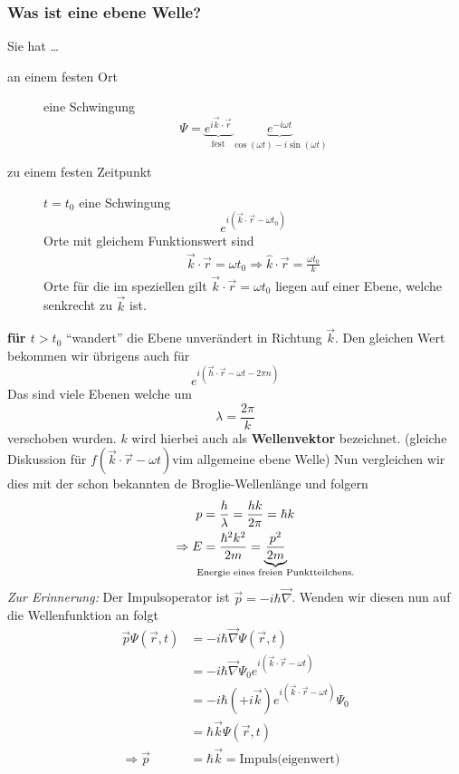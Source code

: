 \documentclass[oneside]{book}
\theoremstyle{definition}
\begin{document}
\subsubsection{Was ist eine ebene Welle?}
Sie hat \dots
\begin{description}
	\item[an einem festen Ort] eine Schwingung 
	$$\Psi = \underbrace{e^{i\vec{k} \cdot \vec{r}}}_{\text{fest}} \underbrace{e^{-i\omega t}}_{\cos(\omega t) - i \sin(\omega t)}$$
	\item[zu einem festen Zeitpunkt] $t = t_0$ eine Schwingung 
	$$e^{i (\vec{k} \cdot \vec{r} - \omega t_0)}$$
	Orte mit gleichem Funktionswert sind
	\begin{align*}
	\vec{k} \cdot \vec{r} = \omega t_0 \Rightarrow \hat{k} \cdot \vec{r} = \frac{\omega t_0}{k}
	\end{align*}
	Orte für die im speziellen gilt $\vec{k} \cdot \vec{r} = \omega t_0$ liegen auf einer Ebene, welche senkrecht zu $\vec{k}$ ist.
\end{description}
\textbf{für $t > t_0$} "`wandert"' die Ebene unverändert in Richtung $\vec{k}$.
Den gleichen Wert bekommen wir übrigens auch für 
$$e^{i(\vec{h} \cdot \vec{r} - \omega t - 2 \pi n)}$$
Das sind viele Ebenen welche um
$$\lambda = \frac{2\pi}{k}$$
verschoben wurden. $k$ wird hierbei auch als \textbf{Wellenvektor} bezeichnet.
(gleiche Diskussion für $f(\vec{k} \cdot \vec{r} - \omega t)$vim allgemeine ebene Welle)
Nun vergleichen wir dies mit der schon bekannten de Broglie-Wellenlänge und folgern
\begin{align*}
p &= \frac{h}{\lambda} = \frac{hk}{2\pi} = \hbar k\\
\Rightarrow E &= \frac{\hbar^2 k^2}{2m} = \underbrace{\frac{p^2}{2m}}_{\hspace{-10em}\text{Energie eines freien Punktteilchens.}\hspace{-10em}}
\end{align*}
\textit{Zur Erinnerung:} Der Impulsoperator ist $\vec{p} = - i \hbar \vec{\nabla}$. Wenden wir diesen nun auf die Wellenfunktion an folgt
\begin{align*}
	\vec{p} \Psi(\vec{r}, t) &= - i \hbar \vec{\nabla} \Psi(\vec{r}, t)\\
	&= -i \hbar \vec{\nabla} \Psi_0 e^{i(\vec{k} \cdot \vec{r} - \omega t)}\\
	&= -i \hbar (+ i \vec{k}) e^{i(\vec{k} \cdot \vec{r} - \omega t)} \Psi_0\\
	&= \hbar \vec{k} \Psi(\vec{r}, t)\\
	\Rightarrow \vec{p} &= \hbar \vec{k} = \text{Impuls(eigenwert)}
\end{align*}
\end{document}
